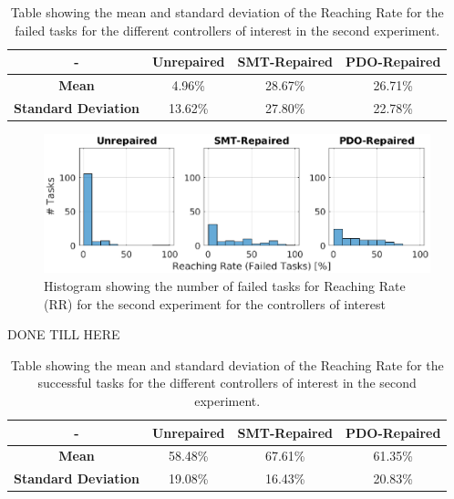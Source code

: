 \begin{table}[H]
    \centering
    \begin{tabular}{|c|c|c|c|}
        \hline
        - & \textbf{Unrepaired} & \textbf{SMT-Repaired} & \textbf{PDO-Repaired} \\
        \hline
        \textbf{Mean} & 4.96\% & 28.67\% & 26.71\% \\
        \textbf{Standard Deviation} & 13.62\% & 27.80\% & 22.78\% \\
        \hline
    \end{tabular}
    \caption{Table showing the mean and standard deviation of the Reaching Rate for the failed tasks for the different controllers of interest in the second experiment.}
    \label{tab:RR-fail-second-mean-std}
\end{table}
\begin{figure}[H]
    \centering
    \includegraphics[width=\textwidth]{Images/second-experiment/exp1_RR_fail_hist.eps}
    \caption{Histogram showing the number of failed tasks for Reaching Rate (RR) for the second experiment for the controllers of interest}
    \label{fig:hist-RR-fail-second}
\end{figure}
DONE TILL HERE
%
%
\begin{table}[H]
    \centering
    \begin{tabular}{|c|c|c|c|}
        \hline
        - & \textbf{Unrepaired} & \textbf{SMT-Repaired} & \textbf{PDO-Repaired} \\
        \hline
        \textbf{Mean} & 58.48\% & 67.61\% & 61.35\% \\
        \textbf{Standard Deviation} & 19.08\% & 16.43\% & 20.83\% \\
        \hline
    \end{tabular}
    \caption{Table showing the mean and standard deviation of the Reaching Rate for the successful tasks for the different controllers of interest in the second experiment.}
    \label{tab:RR-succ-second-mean-std}
\end{table}

